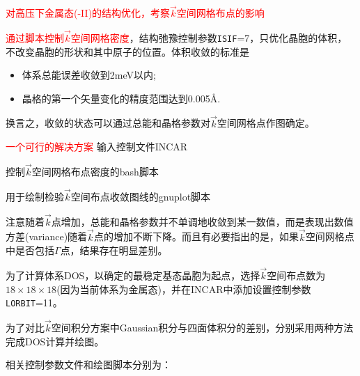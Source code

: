 \textcolor{red}{对高压下金属态(\textrm{-II})的结构优化，考察$\vec k$空间网格布点的影响}

\textcolor{red}{通过脚本控制$\vec k$空间网格密度}，结构弛豫控制参数\texttt{ISIF}=7，只优化晶胞的体积，不改变晶胞的形状和其中原子的位置。体积收敛的标准是
\begin{itemize}
	\item 体系总能误差收敛到2\textrm{meV}以内;
	\item 晶格的第一个矢量变化的精度范围达到0.005\AA.
\end{itemize}
换言之，收敛的状态可以通过总能和晶格参数对$\vec k$空间网格点作图确定。

\textcolor{red}{一个可行的解决方案}
输入控制文件\textrm{INCAR}

控制$\vec k$空间网格布点密度的\textrm{bash}脚本

用于绘制检验$\vec k$空间布点收敛图线的\textrm{gnuplot}脚本

注意随着$\vec k$点增加，总能和晶格参数并不单调地收敛到某一数值，而是表现出数值方差\textrm{(variance)}随着$\vec k$点的增加不断下降。而且有必要指出的是，如果$\vec k$空间网格点中是否包括$\Gamma$点，结果存在明显差别。

为了计算体系\textrm{DOS}，以确定的最稳定基态晶胞为起点，选择$\vec k$空间布点数为$18\times18\times18$(因为当前体系为金属态)，并在\textrm{INCAR}中添加设置控制参数\texttt{LORBIT}=11。

为了对比$\vec k$空间积分方案中\textrm{Gaussian}积分与四面体积分的差别，分别采用两种方法完成\textrm{DOS}计算并绘图。

相关控制参数文件和绘图脚本分别为：

